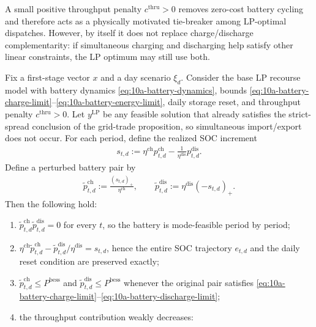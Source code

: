 \begin{remark}
A small positive throughput penalty \(c^{\mathrm{thru}}>0\) removes zero-cost battery cycling and therefore acts as a physically motivated tie-breaker among LP-optimal dispatches. However, by itself it does not replace charge/discharge complementarity: if simultaneous charging and discharging help satisfy other linear constraints, the LP optimum may still use both.
\end{remark}

\begin{proposition}
Fix a first-stage vector \(x\) and a day scenario \(\xi_d\). Consider the base LP recourse model with battery dynamics \eqref{eq:10a-battery-dynamics}, bounds \eqref{eq:10a-battery-charge-limit}--\eqref{eq:10a-battery-energy-limit}, daily storage reset, and throughput penalty \(c^{\mathrm{thru}}>0\). Let \(y^{\mathrm{LP}}\) be any feasible solution that already satisfies the strict-spread conclusion of the grid-trade proposition, so simultaneous import/export does not occur. For each period, define the realized SOC increment
\begin{align}
s_{t,d} := \eta^{\mathrm{ch}} p^{\mathrm{ch}}_{t,d} - \frac{1}{\eta^{\mathrm{dis}}} p^{\mathrm{dis}}_{t,d}.
\end{align}
Define a perturbed battery pair by
\begin{align}
\widetilde p^{\mathrm{ch}}_{t,d} := \frac{(s_{t,d})_+}{\eta^{\mathrm{ch}}},
\qquad
\widetilde p^{\mathrm{dis}}_{t,d} := \eta^{\mathrm{dis}}(-s_{t,d})_+.
\label{eq:10a-storage-mode-perturbation}
\end{align}
Then the following hold:
\begin{enumerate}
  \item \(\widetilde p^{\mathrm{ch}}_{t,d}\widetilde p^{\mathrm{dis}}_{t,d}=0\) for every \(t\), so the battery is mode-feasible period by period;
  \item \(\eta^{\mathrm{ch}}\widetilde p^{\mathrm{ch}}_{t,d} - \widetilde p^{\mathrm{dis}}_{t,d}/\eta^{\mathrm{dis}} = s_{t,d}\), hence the entire SOC trajectory \(e_{t,d}\) and the daily reset condition are preserved exactly;
  \item \(\widetilde p^{\mathrm{ch}}_{t,d}\le P^{\mathrm{bess}}\) and \(\widetilde p^{\mathrm{dis}}_{t,d}\le P^{\mathrm{bess}}\) whenever the original pair satisfies \eqref{eq:10a-battery-charge-limit}--\eqref{eq:10a-battery-discharge-limit};
  \item the throughput contribution weakly decreases:

\end{enumerate}
\end{proposition}

